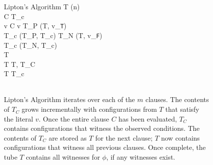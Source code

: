 
\begin{figure}[htbp]
	\renewcommand{\figurename}{Algorithm}
	\renewcommand{\thepseudocode}{\ref{liptonAlgorithm}}
	
	\begin{center}

	\begin{pseudocode}[shadowbox]{Lipton's Algorithm}{\phi}
	T \GETS {}(n) \\
	\FOREACH {} C  \phi \DO
		\BEGIN
		T_c \GETS \emptyset \\
		\FOREACH {} v  C \DO
			\BEGIN
				\IF v  \THEN
					\BEGIN
						T_P \GETS {}(T, v_{\texttt{T}})\\
						T_c \GETS {}(T_P, T_c)						
					\END
				\ELSE
					\BEGIN
						T_N \GETS {}(T, v_{\texttt{F}})\\
						T_c \GETS {}(T_N, T_c)						
					\END
			\END
		\\
		T \GETS \emptyset \\
		T \GETS {}T, T_C\text{)} \\
		T \GETS {}T_c\text{)} \\
		\END
	\\
	\end{pseudocode}

\caption{{\sc Lipton's Algorithm} iterates over each of the $m$ clauses.  The contents of $T_C$ grows incrementally with configurations from $T$ that satisfy the literal $v$.  Once the entire clause $C$ has been evaluated, $T_C$ contains configurations that witness the observed conditions.  The contents of $T_C$ are stored as $T$ for the next clause; $T$ now contains configurations that witness all previous clauses.  Once complete, the tube $T$ contains all witnesses for $\phi$, if any witnesses exist.}
\label{liptonAlgorithm}
\end{center}
\end{figure}

